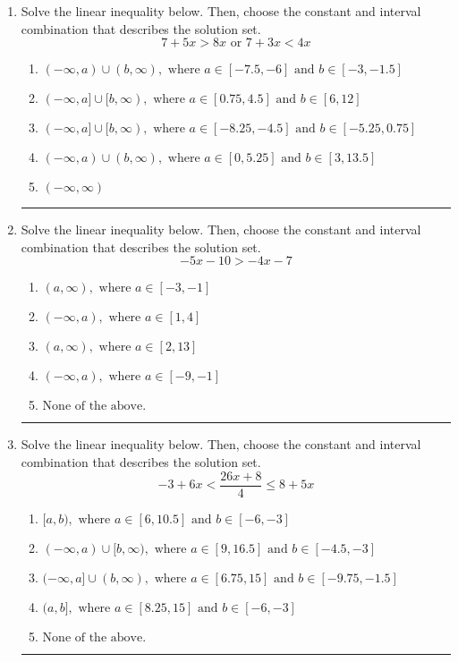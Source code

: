 \documentclass[14pt]{extbook}
\newcommand{\litem}[1]{\item#1\hspace*{-1cm}\rule{\textwidth}{0.4pt}}
\begin{document}
\begin{enumerate}
{\begin{enumerate}[label=\Alph*.]
\end{enumerate} }
\litem{
Solve the linear inequality below. Then, choose the constant and interval combination that describes the solution set.\[ 7 + 5 x > 8 x \text{ or } 7 + 3 x < 4 x \]\begin{enumerate}[label=\Alph*.]
\item \( (-\infty, a) \cup (b, \infty), \text{ where } a \in [-7.5, -6] \text{ and } b \in [-3, -1.5] \)
\item \( (-\infty, a] \cup [b, \infty), \text{ where } a \in [0.75, 4.5] \text{ and } b \in [6, 12] \)
\item \( (-\infty, a] \cup [b, \infty), \text{ where } a \in [-8.25, -4.5] \text{ and } b \in [-5.25, 0.75] \)
\item \( (-\infty, a) \cup (b, \infty), \text{ where } a \in [0, 5.25] \text{ and } b \in [3, 13.5] \)
\item \( (-\infty, \infty) \)

\end{enumerate} }
\litem{
Solve the linear inequality below. Then, choose the constant and interval combination that describes the solution set.\[ -5x -10 > -4x -7 \]\begin{enumerate}[label=\Alph*.]
\item \( (a, \infty), \text{ where } a \in [-3, -1] \)
\item \( (-\infty, a), \text{ where } a \in [1, 4] \)
\item \( (a, \infty), \text{ where } a \in [2, 13] \)
\item \( (-\infty, a), \text{ where } a \in [-9, -1] \)
\item \( \text{None of the above}. \)

\end{enumerate} }
\litem{
Solve the linear inequality below. Then, choose the constant and interval combination that describes the solution set.\[ -3 + 6 x < \frac{26 x + 8}{4} \leq 8 + 5 x \]\begin{enumerate}[label=\Alph*.]
\item \( [a, b), \text{ where } a \in [6, 10.5] \text{ and } b \in [-6, -3] \)
\item \( (-\infty, a) \cup [b, \infty), \text{ where } a \in [9, 16.5] \text{ and } b \in [-4.5, -3] \)
\item \( (-\infty, a] \cup (b, \infty), \text{ where } a \in [6.75, 15] \text{ and } b \in [-9.75, -1.5] \)
\item \( (a, b], \text{ where } a \in [8.25, 15] \text{ and } b \in [-6, -3] \)
\item \( \text{None of the above.} \)


\end{enumerate}}
\end{enumerate}
\end{document}
